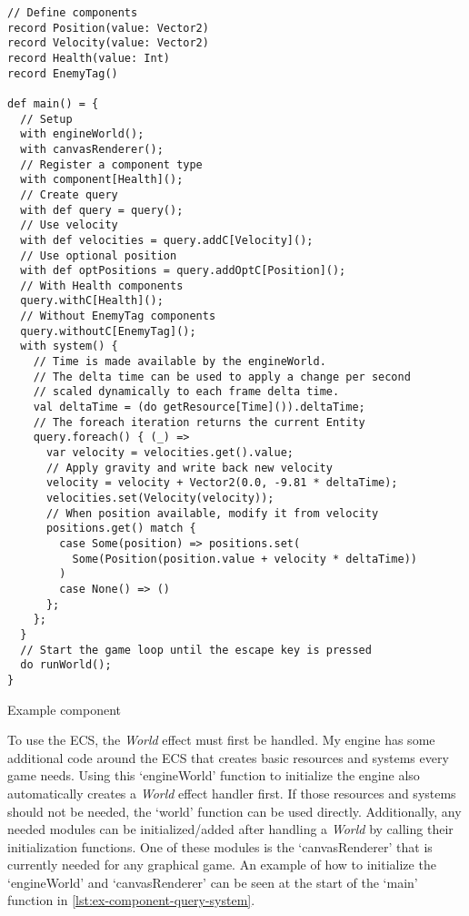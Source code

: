 \begin{listing}
\begin{lstlisting}
// Define components
record Position(value: Vector2)
record Velocity(value: Vector2)
record Health(value: Int)
record EnemyTag()

def main() = {
  // Setup
  with engineWorld();
  with canvasRenderer();
  // Register a component type
  with component[Health]();
  // Create query
  with def query = query();
  // Use velocity
  with def velocities = query.addC[Velocity]();
  // Use optional position
  with def optPositions = query.addOptC[Position]();
  // With Health components
  query.withC[Health]();
  // Without EnemyTag components
  query.withoutC[EnemyTag]();
  with system() {
    // Time is made available by the engineWorld.
    // The delta time can be used to apply a change per second
    // scaled dynamically to each frame delta time.
    val deltaTime = (do getResource[Time]()).deltaTime;
    // The foreach iteration returns the current Entity
    query.foreach() { (_) =>
      var velocity = velocities.get().value;
      // Apply gravity and write back new velocity
      velocity = velocity + Vector2(0.0, -9.81 * deltaTime);
      velocities.set(Velocity(velocity));
      // When position available, modify it from velocity
      positions.get() match {
        case Some(position) => positions.set(
          Some(Position(position.value + velocity * deltaTime))
        )
        case None() => ()
      };
    };
  }
  // Start the game loop until the escape key is pressed
  do runWorld();
}
\end{lstlisting}
\caption{Example component}
\label{lst:ex-component-query-system}
\end{listing}

To use the ECS, the \textit{World} effect must first be handled. My engine has some additional code around the ECS that creates basic resources and systems every game needs. Using this `engineWorld' function to initialize the engine also automatically creates a \textit{World} effect handler first. If those resources and systems should not be needed, the `world' function can be used directly. Additionally, any needed modules can be initialized/added after handling a \textit{World} by calling their initialization functions. One of these modules is the `canvasRenderer' that is currently needed for any graphical game. An example of how to initialize the `engineWorld' and `canvasRenderer' can be seen at the start of the `main' function in \cref{lst:ex-component-query-system}.

